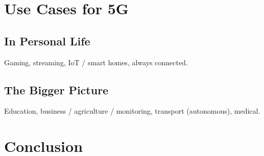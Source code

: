 \documentclass[journal]{IEEEtran}
\begin{document}
\section{Use Cases for 5G}
\subsection{In Personal Life}
Gaming, streaming, IoT / smart homes, always connected.
\subsection{The Bigger Picture}
Education, business / agriculture / monitoring, transport (autonomous), medical.

\section{Conclusion}

\printbibliography
\end{document}
